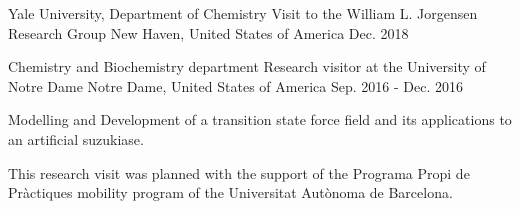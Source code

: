 

\begin{cventries}

  \cventry
    {Yale University, Department of Chemistry} %
    {Visit to the William L. Jorgensen Research Group} %
    {New Haven, United States of America} %
    {Dec. 2018} %
    {~}

  \cventry
    {Chemistry and Biochemistry department} %
    {Research visitor at the University of Notre Dame} %
    {Notre Dame, United States of America} %
    {Sep. 2016 - Dec. 2016} %
    {
      \begin{cvitems} %
        \item {Modelling and Development of a transition state force field and its applications to an artificial suzukiase.}
        \item {This research visit was planned with the support of the Programa Propi de Pràctiques mobility program of the Universitat Autònoma de Barcelona.}
      \end{cvitems}
    }

\end{cventries}
